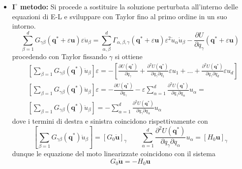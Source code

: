 \begin{itemize}
	\item \textbf{$\bm{I}^{\circ}$ metodo:} Si procede a sostituire la soluzione perturbata all'interno delle equazioni di E-L e sviluppare con Taylor fino al primo ordine in un suo intorno.
	\begin{equation}
\sum_{\beta = 1}^d G_{\gamma \beta}\left(\bm{q}^*+\varepsilon \bm{u}\right) \varepsilon \ddot{u}_\beta=\sum_{\alpha, \beta}^d \Gamma_{\alpha, \beta, \gamma}\left(\bm{q}^*+\varepsilon \bm{u}\right) \varepsilon^2 \dot{u}_\alpha \dot{u}_\beta-\frac{\partial U}{\partial q_\gamma}\left(\bm{q}^*+\varepsilon \bm{u}\right)
\end{equation}
procedendo con Taylor fissando $\gamma$ si ottiene 
\begin{equation}
\begin{aligned}
& \left[\sum_{\beta=1} G_{\gamma \beta}\left(\boldsymbol{q}^*\right) \ddot{u}_\beta\right] \varepsilon=-\left[\frac{\partial U\left(\boldsymbol{q}^*\right)}{\partial q_\gamma}+\frac{\partial^2 U\left(\boldsymbol{q}^*\right)}{\partial q_\gamma \partial q_1} \varepsilon u_1+\ldots+\frac{\partial^2 U\left(\boldsymbol{q}^*\right)}{\partial q_\gamma \partial q_d} \varepsilon u_d\right]\\[0.2in]
& {\left[\sum_{\beta = 1} G_{\gamma \beta}\left(\bm{q}^*\right) \ddot{u}_\beta\right] \varepsilon=-\frac{\partial U\left(\bm{q}^*\right)}{\partial q_\gamma}-\varepsilon \sum_{\alpha=1}^d \frac{\partial^2 U\left(\bm{q}^*\right) }{\partial q_\gamma \partial q_\alpha}}u_\alpha = \\[0.2in]
&{\left[\sum_{\beta = 1} G_{\gamma \beta}\left(\bm{q}^*\right) \ddot{u}_\beta\right] =-\sum_{\alpha=1}^d \frac{\partial^2 U\left(\bm{q}^*\right) }{\partial q_\gamma \partial q_\alpha}}u_\alpha
\end{aligned}
\end{equation}
dove i termini di destra e sinistra coincidono rispettivamente con 
\begin{equation}
\left[\sum_{\beta = 1} G_{\gamma \beta}\left(\bm{q}^*\right) \ddot{u}_\beta\right] = \left [ G_{0} \ddot{\bm{u}} \right ]_{\gamma} \quad \quad \sum_{\alpha=1}^d \frac{\partial^2 U\left(\boldsymbol{q}^*\right)}{\partial q_\gamma \partial q_\alpha} u_\alpha = \left [ H_0 \bm{u} \right ]_{\gamma}
\end{equation}
dunque le equazione del moto linearizzate coincidono con il sistema
\begin{equation}
	\boxed{G_0 \bm{\ddot{u}} = -H_0 \bm{u}}
\end{equation}

\end{itemize}
